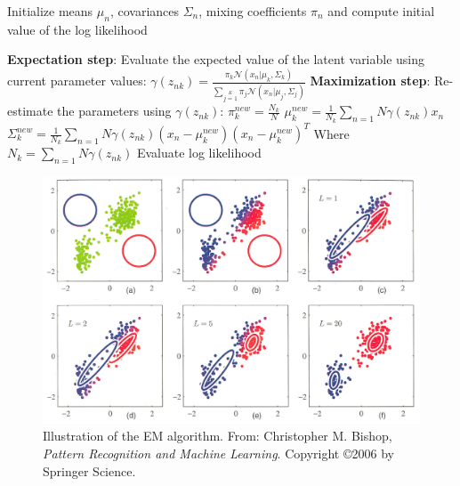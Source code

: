 \begin{algorithmic}
\State Initialize means $\mu_n$, covariances $\Sigma_n$, mixing coefficients $\pi_n$ and compute initial value of the log likelihood

\Repeat

	\State \textbf{Expectation step}: Evaluate the expected value of the latent variable using current parameter values:
		\State $\gamma(z_{nk}) = 
		\frac{\pi_k\mathcal{N}(x_n|\mu_k, \Sigma_k)}{\sum\limits_{j=1}\limits^{K}\pi_j\mathcal{N}(x_n|\mu_j, \Sigma_j)}$
	\State \textbf{Maximization step}: Re-estimate the parameters using $\gamma(z_{nk})$:
		\State $\pi^{new}_k = \frac{N_k}{N}$
		\State $\mu^{new}_k = \frac{1}{N_k}\sum\limits_{n=1}\limits{N}\gamma(z_{nk})x_n$
		\State $\Sigma^{new}_k = \frac{1}{N_k}\sum\limits_{n=1}\limits{N}\gamma(z_{nk}) (x_n - \mu^{new}_k) (x_n - \mu^{new}_k)^T$
		\State Where $N_k = \sum\limits_{n=1}\limits{N}\gamma(z_{nk})$
	\State Evaluate log likelihood

\end{algorithmic}

\begin{figure}[!h]
\begin{center}
\noindent \includegraphics[scale=0.1]{figures/mixture_model} 
\newline
\caption{Illustration of the EM algorithm. From: Christopher M. Bishop, \textit{Pattern Recognition and Machine Learning}. Copyright \copyright  2006 by Springer Science.}
\label{mixture_model}
\end{center} 
\end{figure}
